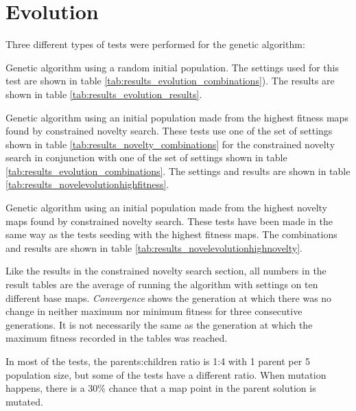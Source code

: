 \section{Evolution}
\label{results_evolution}
Three different types of tests were performed for the genetic algorithm:

\begin{my_itemize}

	\item Genetic algorithm using a random initial population. The settings used for this test are shown in table \ref{tab:results_evolution_combinations}). The results are shown in table \ref{tab:results_evolution_results}. 

	\item Genetic algorithm using an initial population made from the highest fitness maps found by constrained novelty search. These tests use one of the set of settings shown in table \ref{tab:results_novelty_combinations} for the constrained novelty search in conjunction with one of the set of settings shown in table \ref{tab:results_evolution_combinations}. The settings and results are shown in table \ref{tab:results_novelevolutionhighfitness}.

	\item Genetic algorithm using an initial population made from the highest novelty maps found by constrained novelty search. These tests have been made in the same way as the tests seeding with the highest fitness maps. The combinations and results are shown in table \ref{tab:results_novelevolutionhighnovelty}.

\end{my_itemize}

Like the results in the constrained novelty search section, all numbers in the result tables are the average of running the algorithm with settings on ten different base maps. \textit{Convergence} shows the generation at which there was no change in neither maximum nor minimum fitness for three consecutive generations. It is not necessarily the same as the generation at which the maximum fitness recorded in the tables was reached.

In most of the tests, the parents:children ratio is 1:4 with 1 parent per 5 population size, but some of the tests have a different ratio. When mutation happens, there is a 30\% chance that a map point in the parent solution is mutated.

